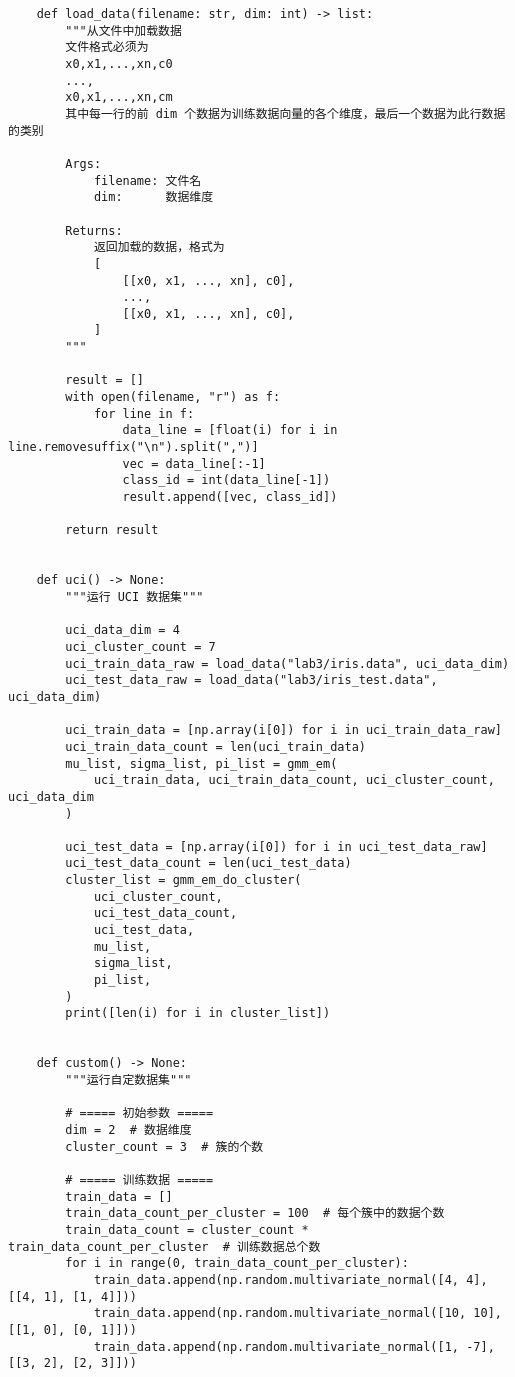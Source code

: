 \begin{verbatim}
    def load_data(filename: str, dim: int) -> list:
        """从文件中加载数据
        文件格式必须为
        x0,x1,...,xn,c0
        ...,
        x0,x1,...,xn,cm
        其中每一行的前 dim 个数据为训练数据向量的各个维度，最后一个数据为此行数据的类别

        Args:
            filename: 文件名
            dim:      数据维度

        Returns:
            返回加载的数据，格式为
            [
                [[x0, x1, ..., xn], c0],
                ...,
                [[x0, x1, ..., xn], c0],
            ]
        """

        result = []
        with open(filename, "r") as f:
            for line in f:
                data_line = [float(i) for i in line.removesuffix("\n").split(",")]
                vec = data_line[:-1]
                class_id = int(data_line[-1])
                result.append([vec, class_id])

        return result


    def uci() -> None:
        """运行 UCI 数据集"""

        uci_data_dim = 4
        uci_cluster_count = 7
        uci_train_data_raw = load_data("lab3/iris.data", uci_data_dim)
        uci_test_data_raw = load_data("lab3/iris_test.data", uci_data_dim)

        uci_train_data = [np.array(i[0]) for i in uci_train_data_raw]
        uci_train_data_count = len(uci_train_data)
        mu_list, sigma_list, pi_list = gmm_em(
            uci_train_data, uci_train_data_count, uci_cluster_count, uci_data_dim
        )

        uci_test_data = [np.array(i[0]) for i in uci_test_data_raw]
        uci_test_data_count = len(uci_test_data)
        cluster_list = gmm_em_do_cluster(
            uci_cluster_count,
            uci_test_data_count,
            uci_test_data,
            mu_list,
            sigma_list,
            pi_list,
        )
        print([len(i) for i in cluster_list])


    def custom() -> None:
        """运行自定数据集"""

        # ===== 初始参数 =====
        dim = 2  # 数据维度
        cluster_count = 3  # 簇的个数

        # ===== 训练数据 =====
        train_data = []
        train_data_count_per_cluster = 100  # 每个簇中的数据个数
        train_data_count = cluster_count * train_data_count_per_cluster  # 训练数据总个数
        for i in range(0, train_data_count_per_cluster):
            train_data.append(np.random.multivariate_normal([4, 4], [[4, 1], [1, 4]]))
            train_data.append(np.random.multivariate_normal([10, 10], [[1, 0], [0, 1]]))
            train_data.append(np.random.multivariate_normal([1, -7], [[3, 2], [2, 3]]))


\end{verbatim}
